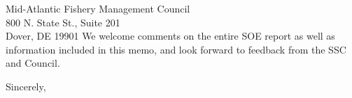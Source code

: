 \documentclass[10pt,]{letter}
\begin{document}
\begin{letter}{Mid-Atlantic Fishery Management Council\\800 N. State
St., Suite 201\\Dover, DE 19901}
We welcome comments on the entire SOE report as well as information
included in this memo, and look forward to feedback from the SSC and
Council.

\longindentation=0pt
\closing{Sincerely,}

\end{letter}
\end{document}

